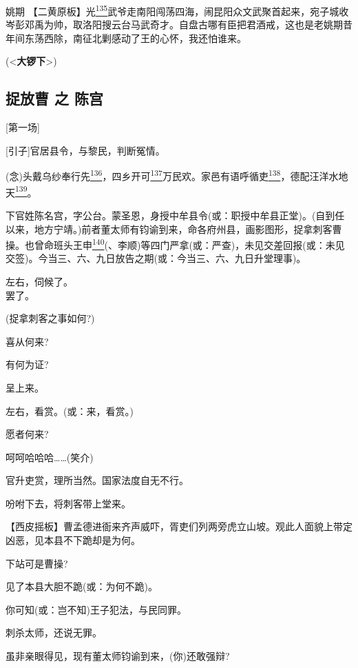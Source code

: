 姚期
【二黄原板】光\protect\hyperlink{fn135}{\textsuperscript{135}}武爷走南阳闯荡四海，闹昆阳众文武聚首起来，宛子城收岑彭邓禹为帅，取洛阳搜云台马武奇才。自盘古哪有臣把君酒戒，这也是老姚期昔年间东荡西除，南征北剿感动了王的心怀，我还怕谁来。

(\textless{}\textbf{大锣下}\textgreater{})

\hypertarget{ux6349ux653eux66f9-ux4e4b-ux9648ux5bab}{%
\subsection{捉放曹 之
陈宫}\label{ux6349ux653eux66f9-ux4e4b-ux9648ux5bab}}

{[}第一场{]}

{[}引子{]}官居县令，与黎民，判断冤情。

(念)头戴乌纱奉行先\protect\hyperlink{fn136}{\textsuperscript{136}}，四乡开可\protect\hyperlink{fn137}{\textsuperscript{137}}万民欢。家邑有语呼循吏\protect\hyperlink{fn138}{\textsuperscript{138}}，德配汪洋水地天\protect\hyperlink{fn139}{\textsuperscript{139}}。

下官姓陈名宫，字公台。蒙圣恩，身授中牟县令(或：职授中牟县正堂)。(自到任以来，地方宁靖。)前者董太师有钧谕到来，命各府州县，画影图形，捉拿刺客曹操。也曾命班头王申\protect\hyperlink{fn140}{\textsuperscript{140}}(、李顺)等四门严拿(或：严查)，未见交差回报(或：未见交签)。今当三、六、九日放告之期(或：今当三、六、九日升堂理事)。

左右，伺候了。\\
罢了。

(捉拿刺客之事如何?)

喜从何来?

有何为证?

呈上来。

左右，看赏。(或：来，看赏。)

愿者何来?

呵呵哈哈哈\ldots{}\ldots{}(笑介)

官升吏赏，理所当然。国家法度自无不行。

吩咐下去，将刺客带上堂来。

【西皮摇板】曹孟德进衙来齐声威吓，胥吏们列两旁虎立山坡。观此人面貌上带定凶恶，见本县不下跪却是为何。

下站可是曹操?

见了本县大胆不跪(或：为何不跪)。

你可知(或：岂不知)王子犯法，与民同罪。

刺杀太师，还说无罪。

虽非亲眼得见，现有董太师钧谕到来，(你)还敢强辩?

